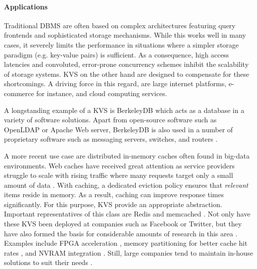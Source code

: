 \paragraph{Applications}

Traditional \ac{DBMS} are often based on complex architectures featuring query
frontends and sophisticated storage mechanisms. While this works well in many
cases, it severely limits the performance in situations where a simpler storage
paradigm (e.g. key-value pairs) is sufficient. As a consequence, high access
latencies and convoluted, error-prone concurrency schemes inhibit the
scalability of storage systems. \ac{KVS} on the other hand are designed to compensate
for these shortcomings. A driving force in this regard, are large internet
platforms, e-commerce for instance, and cloud computing services.

A longstanding example of a \ac{KVS} is BerkeleyDB which acts as a database in a
variety of software solutions. Apart from open-source software such as OpenLDAP
or Apache Web server, BerkeleyDB is also used in a number of proprietary
software such as messaging servers, switches, and routers
\cite{kaestner2007aspect, olson1999berkeley}.

A more recent use case are distributed in-memory caches often found in big-data
environments. Web caches have received great attention as service providers
struggle to scale with rising traffic where many requests target only a small
amount of data \cite{xu2014characterizing}. With caching, a dedicated eviction
policy ensures that \emph{relevant} items reside in memory. As a result, caching
can improve response times significantly. For this purpose, \ac{KVS} provide an
appropriate abstraction. Important representatives of this class are Redis and
memcached \cite{redis2017home, memcached2017home}. Not only have these \ac{KVS} been
deployed at companies such as Facebook or Twitter, but they have also formed the
basis for considerable amounts of research in this area
\cite{xu2014characterizing}. Examples include \ac{FPGA} acceleration
\cite{lavasani2014fpga}, memory partitioning for better cache hit rates
\cite{carra2014memory}, and \ac{NVRAM} integration \cite{wu2016nvmcached,
malinowski2017using, venkataraman2011consistent}. Still, large companies tend to
maintain in-house solutions to suit their needs \cite{chang2008bigtable,
decandia2007dynamo, lakshman2010cassandra, wang2015hydradb}.

